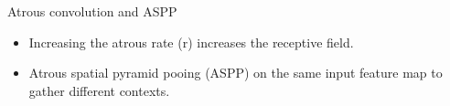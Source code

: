 \documentclass{beamer}
\begin{document}
\begin{frame}{Atrous convolution and ASPP}

	\begin{small}
		\begin{itemize}
			\item Increasing the atrous rate (r) increases the receptive field.
			\item Atrous spatial pyramid pooing (ASPP) on the same input feature map to gather different contexts.
		\end{itemize}
	\end{small}
	
	

\end{frame}
\end{document}
